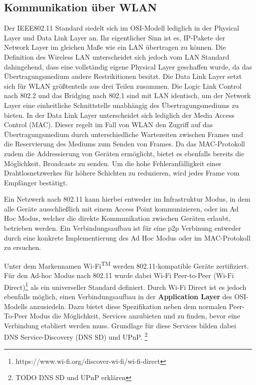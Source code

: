     \subsection{Kommunikation über WLAN}
        Der IEEE802.11 Standard siedelt sich im OSI-Modell lediglich in der Physical Layer und Data Link Layer an. Ihr eigentlicher Sinn ist es,
        IP-Pakete der Network Layer im gleichen Maße wie ein LAN übertragen zu können.
        Die Definition des Wireless LAN unterscheidet sich jedoch vom LAN Standard dahingehend, dass eine vollständig eigene Physical Layer geschaffen wurde,
        da das Übertragungsmedium andere Restrikitionen besitzt. Die Data Link Layer setzt sich für WLAN größtenteils aus drei Teilen zusammen.
        Die Logic Link Control nach 802.2 und das Bridging nach 802.1 sind mit LAN identisch, um der Network Layer eine einheitliche Schnittstelle unabhängig des Übertragungsmediums zu bieten.
        In der Data Link Layer unterscheidet sich lediglich der Media Access Control (MAC).\cite[S.311]{Sauter}
        Dieser regelt im Fall von WLAN den Zugriff auf das Übertragungsmedium durch unterschiedliche Wartezeiten zwischen Frames und die Reservierung des Mediums zum Senden von Frames.
        Da das MAC-Protokoll zudem die Addressierung von Geräten ermöglicht, bietet es ebenfalls bereits die Möglichkeit, Broadcasts zu senden.
        Um die hohe Fehleranfälligkeit eines Drahtlosnetzwerkes für höhere Schichten zu reduzieren, wird jedes Frame vom Empfänger bestätigt.\cite[S.325-327]{Sauter}
        
        Ein Netzwerk nach 802.11 kann hierbei entweder im Infrastruktur Modus, in dem alle Geräte ausschließlich mit einem Access Point kommunizieren,
        oder im Ad Hoc Modus, welcher die direkte Kommunikation zwischen Geräten erlaubt, betrieben werden.\cite[S.82]{Sikora}
        Ein Verbindungsaufbau ist für eine p2p Verbinung entweder durch eine konkrete Implementierung des Ad Hoc Modus oder
        im MAC-Protokoll zu ersuchen.

        Unter dem Markennamen Wi-Fi\textsuperscript{TM} werden 802.11-kompatible Geräte zertifiziert.\cite[S.80]{Sikora}
        Für den Ad-hoc Modus nach 802.11 wurde dabei Wi-Fi Peer-to-Peer (Wi-Fi Direct)\textregistered\footnote{https://www.wi-fi.org/discover-wi-fi/wi-fi-direct} als ein universeller Standard definiert.
        Durch Wi-Fi Direct ist es jedoch ebenfalls möglich, einen Verbindungsaufbau in der {\bf Application Layer} des OSI-Modells anzusiedeln.
        Dazu bietet diese Spezifikation neben dem normalen Peer-To-Peer Modus die Möglichkeit, Services anzubieten und zu finden, bevor eine Verbindung etabliert werden muss.
        Grundlage für diese Services bilden dabei DNS Service-Discovery (DNS SD) und UPnP. \footnote{TODO DNS SD und UPnP erklären}

